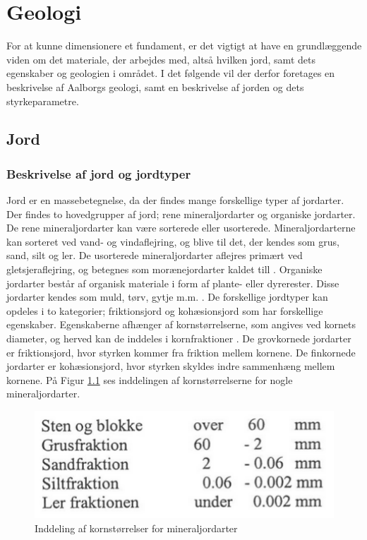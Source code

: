 \chapter{Geologi}
For at kunne dimensionere et fundament, er det vigtigt at have en grundlæggende viden om det materiale, der arbejdes med, altså hvilken jord, samt dets egenskaber og geologien i området. I det følgende vil der derfor foretages en beskrivelse af Aalborgs geologi, samt en beskrivelse af jorden og dets styrkeparametre.

\section{Jord}
\subsection{Beskrivelse af jord og jordtyper}
Jord er en massebetegnelse, da der findes mange forskellige typer af jordarter. Der findes to hovedgrupper af jord; rene mineraljordarter og organiske jordarter. 
\newline \indent{     }  De rene mineraljordarter kan være sorterede eller usorterede. Mineraljordarterne kan sorteret ved vand- og vindaflejring, og blive til det, der kendes som grus, sand, silt og ler. De usorterede mineraljordarter aflejres primært ved gletsjeraflejring, og betegnes som morænejordarter kaldet till \citep{jordarter}.
\newline \indent{     }  Organiske jordarter består af organisk materiale i form af plante- eller dyrerester. Disse jordarter kendes som muld, tørv, gytje m.m. \citep{miljo}.
\newline \indent{     } De forskellige jordtyper kan opdeles i to kategorier; friktionsjord og kohæsionsjord som har forskellige egenskaber. Egenskaberne afhænger af kornstørrelserne, som angives ved kornets diameter, og herved kan de inddeles i kornfraktioner \citep{geoteknik}. De grovkornede jordarter er friktionsjord, hvor styrken kommer fra friktion mellem kornene. De finkornede jordarter er kohæsionsjord, hvor styrken skyldes indre sammenhæng mellem kornene. På Figur \ref{fig:kornstorrelser} ses inddelingen af kornstørrelserne for nogle mineraljordarter. 

\begin{figure}[htbp]	\centering
	\begin{minipage}[b]{0.48\textwidth}
		\includegraphics[width=1.0\textwidth]{billeder/kornetsdiameter.png}
		\caption{Inddeling af kornstørrelser for mineraljordarter \citep{jordarter}}
		\label{fig:kornstorrelser}
	\end{minipage}\hfill
\end{figure}

